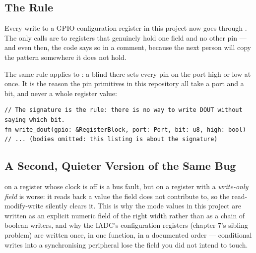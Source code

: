 \subsection{The Rule}

Every write to a GPIO configuration register in this project now goes through
. The only  calls are to registers that genuinely hold one
field and no other pin — and even then, the code says so in a comment, because the next person will
copy the pattern somewhere it does not hold.

The same rule applies to : a blind  there sets every pin on the
port high or low at once. It is the reason the pin primitives in this repository all take a port and
a bit, and never a whole register value:

\begin{verbatim}
// The signature is the rule: there is no way to write DOUT without saying which bit.
fn write_dout(gpio: &RegisterBlock, port: Port, bit: u8, high: bool)
// ... (bodies omitted: this listing is about the signature)
\end{verbatim}

\subsection{A Second, Quieter Version of the Same Bug}

 on a register whose clock is off is a bus fault, but  on
a register with a \emph{write-only field} is worse: it reads back a value the field does not
contribute to, so the read-modify-write silently clears it. This is why the mode values in this
project are written as an explicit numeric field of the right width rather than as a chain of
boolean writers, and why the IADC's configuration registers (chapter 7's sibling problem) are written
once, in one function, in a documented order — conditional writes into a synchronising peripheral
lose the field you did not intend to touch.
